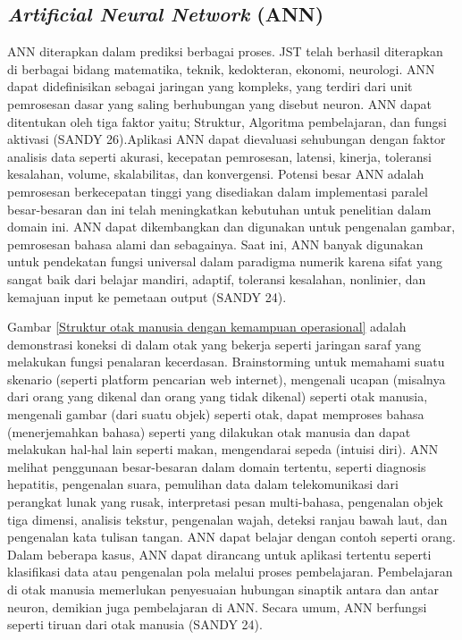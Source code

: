 \subsection{\textit{Artificial Neural Network} (ANN)}
\hspace{1,2cm} ANN diterapkan dalam prediksi berbagai proses. JST telah berhasil diterapkan di berbagai bidang matematika, teknik, kedokteran, ekonomi, neurologi. ANN dapat didefinisikan sebagai jaringan yang kompleks, yang terdiri dari unit pemrosesan dasar yang saling berhubungan yang disebut neuron. ANN dapat ditentukan oleh tiga faktor yaitu; Struktur, Algoritma pembelajaran, dan fungsi aktivasi (SANDY 26).Aplikasi ANN dapat dievaluasi sehubungan dengan faktor analisis data seperti akurasi, kecepatan pemrosesan, latensi, kinerja, toleransi kesalahan, volume, skalabilitas, dan konvergensi. Potensi besar ANN adalah pemrosesan berkecepatan tinggi yang disediakan dalam implementasi paralel besar-besaran dan ini telah meningkatkan kebutuhan untuk penelitian dalam domain ini. ANN dapat dikembangkan dan digunakan untuk pengenalan gambar, pemrosesan bahasa alami dan sebagainya. Saat ini, ANN banyak digunakan untuk pendekatan fungsi universal dalam paradigma numerik karena sifat yang sangat baik dari belajar mandiri, adaptif, toleransi kesalahan, nonlinier, dan kemajuan input ke pemetaan output (SANDY 24).

Gambar \ref{Struktur otak manusia dengan kemampuan operasional} adalah demonstrasi koneksi di dalam otak yang bekerja seperti jaringan saraf yang melakukan fungsi penalaran kecerdasan. Brainstorming untuk memahami suatu skenario (seperti platform pencarian web internet), mengenali ucapan (misalnya dari orang yang dikenal dan orang yang tidak dikenal) seperti otak manusia, mengenali gambar (dari suatu objek) seperti otak, dapat memproses bahasa (menerjemahkan bahasa) seperti yang dilakukan otak manusia dan dapat melakukan hal-hal lain seperti makan, mengendarai sepeda (intuisi diri). ANN melihat penggunaan besar-besaran dalam domain tertentu, seperti diagnosis hepatitis, pengenalan suara, pemulihan data dalam telekomunikasi dari perangkat lunak yang rusak, interpretasi pesan multi-bahasa, pengenalan objek tiga dimensi, analisis tekstur, pengenalan wajah, deteksi ranjau bawah laut, dan pengenalan kata tulisan tangan. ANN dapat belajar dengan contoh seperti orang. Dalam beberapa kasus, ANN dapat dirancang untuk aplikasi tertentu seperti klasifikasi data atau pengenalan pola melalui proses pembelajaran. Pembelajaran di otak manusia memerlukan penyesuaian hubungan sinaptik antara dan antar neuron, demikian juga pembelajaran di ANN. Secara umum, ANN berfungsi seperti tiruan dari otak manusia (SANDY 24).

